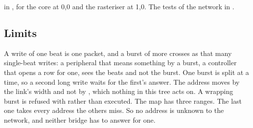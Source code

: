  in , for the core at 0,0 and
the rasteriser at 1,0. The tests of the network in
.

\subsection*{Limits}

A write of one beat is one packet, and a burst of more crosses as
that many single-beat writes: a peripheral that means something by a
burst, a controller that opens a row for one, sees the beats and not
the burst. One burst is split at a time, so a second long write waits
for the first's answer. The address moves by the link's width and
not by , which nothing in this tree acts on. A wrapping
burst is refused with  rather than executed. The map has
three ranges. The last one takes every address the others miss. So no
address is unknown to the network, and neither bridge has to answer for
one.
